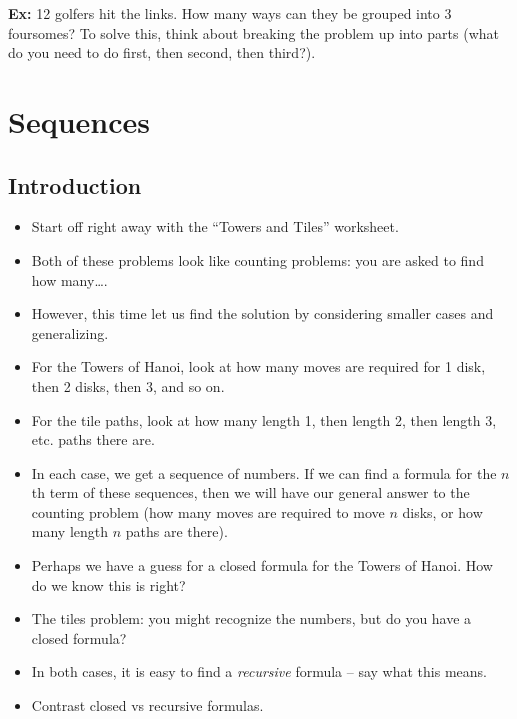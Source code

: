 \documentclass[12pt]{article}
\theoremstyle{plain}
\theoremstyle{definition}
\theoremstyle{remark}
\newcommand{\ex}{\noindent\textbf{Ex:} }
\newcommand{\todayis}[1]{\clearpage{\rhead{\footnotesize #1}}}
\begin{document}
\begin{itemize}
	\ex 12 golfers hit the links.  How many ways can they be grouped into 3 foursomes?  To solve this, think about breaking the problem up into parts (what do you need to do first, then second, then third?).



\end{itemize}


\todayis{Monday, October 22}
\section*{Sequences}
\subsection*{Introduction}

\begin{itemize}
	\item Start off right away with the ``Towers and Tiles'' worksheet.
	\item Both of these problems look like counting problems: you are asked to find how many\ldots.
	\item However, this time let us find the solution by considering smaller cases and generalizing.
	\item For the Towers of Hanoi, look at how many moves are required for 1 disk, then 2 disks, then 3, and so on.
	\item For the tile paths, look at how many length 1, then length 2, then length 3, etc. paths there are.
	\item In each case, we get a sequence of numbers.  If we can find a formula for the $n$th term of these sequences, then we will have our general answer to the counting problem (how many moves are required to move $n$ disks, or how many length $n$ paths are there).
	\item Perhaps we have a guess for a closed formula for the Towers of Hanoi.  How do we know this is right?
	\item The tiles problem: you might recognize the numbers, but do you have a closed formula?
	\item In both cases, it is easy to find a {\em recursive} formula -- say what this means.
	\item Contrast closed vs recursive formulas.

\end{itemize}
\end{document}
